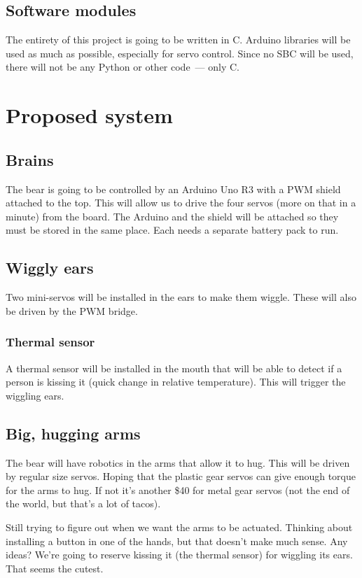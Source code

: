 \documentclass{article}
\begin{document}
\subsection{Software modules}
The entirety of this project is going to be written in C. Arduino libraries will be used as much as possible, especially for servo control. Since no SBC will be used, there will not be any Python or other code~--- only C.

\section{Proposed system}
\subsection{Brains}
The bear is going to be controlled by an Arduino Uno R3 with a PWM shield attached to the top. This will allow us to drive the four servos (more on that in a minute) from the board. The Arduino and the shield will be attached so they must be stored in the same place. Each needs a separate battery pack to run.

\subsection{Wiggly ears}
Two mini-servos will be installed in the ears to make them wiggle. These will also be driven by the PWM bridge.

\subsubsection{Thermal sensor}
A thermal sensor will be installed in the mouth that will be able to detect if a person is kissing it (quick change in relative temperature). This will trigger the wiggling ears.

\subsection{Big, hugging arms}
The bear will have robotics in the arms that allow it to hug. This will be driven by regular size servos. Hoping that the plastic gear servos can give enough torque for the arms to hug. If not it's another \$40 for metal gear servos (not the end of the world, but that's a lot of tacos).

Still trying to figure out when we want the arms to be actuated. Thinking about installing a button in one of the hands, but that doesn't make much sense. Any ideas? We're going to reserve kissing it (the thermal sensor) for wiggling its ears. That seems the cutest.
\end{document}

